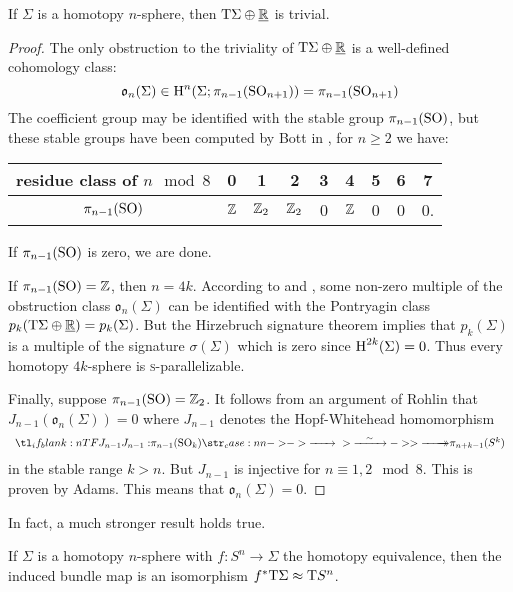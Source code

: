 \begin{theorem}\label{thm:homotopy_spheres_are_stably_parallelizable}
  If $\Sigma$ is a homotopy $n$-sphere, then $\mathrm{T} \Sigma \oplus \underline{\mathbb{R}}$ is trivial. 
\end{theorem}
\begin{proof}
	The only obstruction to the triviality of $\mathrm{T}\Sigma\oplus\underline{\mathbb{R}}$ is a well-defined cohomology class:
	\[
		\mathfrak{o}_n(\Sigma) \in \operatorname{H}^n(\Sigma; \pi_{n-1}({\operatorname{SO}}_{n+1})) = \pi_{n-1}({\operatorname{SO}}_{n+1})
	\]
	The coefficient group may be identified with the stable group $\pi_{n-1}({\operatorname{SO}})$, but these stable groups have been computed by Bott in \cite{bott1957}, for $n\geq 2$ we have:
	\begin{center}
		\begin{tabular}{c|cccccccc}
			\textrm{residue class of $n\mod 8$} & 0 & 1 & 2 & 3 & 4 & 5 & 6 & 7\\
			\hline
			$\pi_{n-1}({\operatorname{SO}})$ & $\mathbb{Z}$ & $\mathbb{Z}_2$ & $\mathbb{Z}_2$ & 0 & $\mathbb{Z}$ & 0 & 0 & 0.
		\end{tabular}
	\end{center}
	If $\pi_{n-1}({\operatorname{SO}})$ is zero, we are done. 

	If $\pi_{n-1}({\operatorname{SO}}) = \mathbb{Z}$, then $n=4k$. According to \cite{kervairemilnor1960} and \cite{kervaire1959}, some non-zero multiple of the obstruction class $\mathfrak{o}_n(\Sigma)$ can be identified with the Pontryagin class $p_k(\mathrm{T} \Sigma\oplus \underline{\mathbb{R}}) = p_k(\Sigma)$.  But the Hirzebruch signature theorem implies  that $p_k(\Sigma)$ is a multiple of the signature $\sigma(\Sigma)$ which is zero since $\operatorname{H}^{2k}(\Sigma)=0$. Thus every homotopy $4k$-sphere is \textsc{s}-parallelizable. 

	Finally, suppose $\pi_{n-1}({\operatorname{SO}})= \mathbb{Z}_2$. It follows from an argument of Rohlin  that $J_{n-1}(\mathfrak{o}_n(\Sigma))=0$ where $J_{n-1}$ denotes the Hopf-Whitehead homomorphism
	\[
		\lkxfunc{J_{n-1}}{\pi_{n-1}(\SO_k)}{\pi_{n+k-1}(S^k)}
	\]
	in the stable range $k >n$. But $J_{n-1}$ is injective for $n\equiv 1, 2\mod 8$. This is proven by Adams.  This means that $\mathfrak{o}_n(\Sigma)=0$.
\end{proof}

In fact, a much stronger result holds true.
\begin{theorem}\label{thm:homotopy_spheres_tangent_bundle}
  If $\Sigma$ is a homotopy $n$-sphere with $f : S^n \to \Sigma$ the homotopy equivalence, then the induced bundle map is an isomorphism $f^*\mathrm{T}\Sigma \approx \mathrm{T} S^n$.
\end{theorem}
